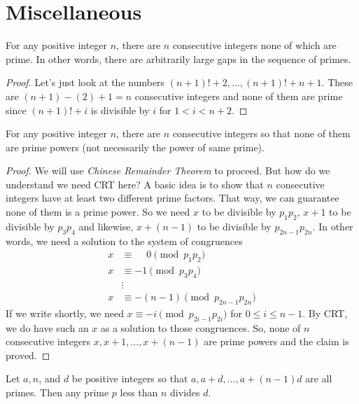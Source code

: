\section{Miscellaneous}
\label{sec:theoremsinprimes}

\begin{theorem}
	For any positive integer $n$, there are $n$ consecutive integers none of which are prime. In other words, there are arbitrarily large gaps in the sequence of primes.
\end{theorem}

\begin{proof}
	Let's just look at the numbers $(n+1)!+2,\ldots,(n+1)!+n+1$. These are $(n+1)-(2)+1=n$ consecutive integers and none of them are prime since $(n+1)!+i$ is divisible by $i$ for $1<i<n+2$.
\end{proof}

\begin{theorem}
	For any positive integer $n$, there are $n$ consecutive integers so that none of them are prime powers (not necessarily the power of same prime).
\end{theorem}

\begin{proof}
	We will use \textit{Chinese Remainder Theorem} to proceed. But how do we understand we need CRT here? A basic idea is to show that $n$ consecutive integers have at least two different prime factors. That way, we can guarantee none of them is a prime power. So we need $x$ to be divisible by $p_1p_2$, $x+1$ to be divisible by $p_3p_4$ and likewise, $x+(n-1)$ to be divisible by $p_{2n-1}p_{2n}$. In other words, we need a solution to the system of congruences
		\begin{align*}
			x & \equiv \phantom{-} 0  \pmod {p_1p_2}\\
			x & \equiv -1  \pmod{p_3p_4}\\
	  &  \vdots \\
			x & \equiv -(n-1) \pmod{p_{2n-1}p_{2n}}
		\end{align*}
	If we write shortly, we need $x\equiv-i\pmod{p_{2i-1}p_{2i}}$ for $0\leq i\leq n-1$. By CRT, we do have such an $x$ as a solution to those congruences. So, none of $n$ consecutive integers $x, x+1, \ldots, x+(n-1)$ are prime powers and the claim is proved.
\end{proof}

\begin{theorem}
	Let $a,n$, and $d$ be positive integers so that $a,a+d,\ldots,a+(n-1)d$ are all primes. Then any prime $p$ less than $n$ divides $d$.
\end{theorem}

